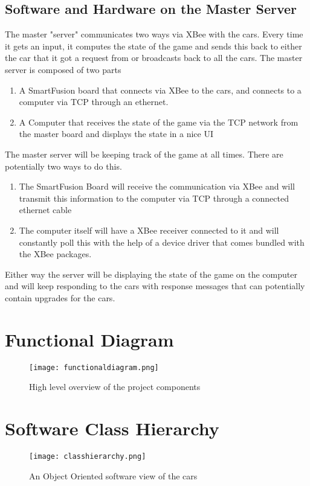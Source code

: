 \documentclass{article}
\begin{document}
\subsection{Software and Hardware on the Master Server}
The master "server" communicates two ways via XBee with the cars.  Every
time it gets an input, it computes the state of the game and sends this back
to either the car that it got a request from or broadcasts back to all the
cars.  The master server is composed of two parts
\begin{enumerate}
    \item A SmartFusion board that connects via XBee to the cars, and connects
    to a computer via TCP through an ethernet.
    \item A Computer that receives the state of the game via the TCP network
    from the master board and displays the state in a nice UI
\end{enumerate}

The master server will be keeping track of the game at all times.  There are
potentially two ways to do this.  
\begin{enumerate}
    \item The SmartFusion Board will receive the communication via XBee and
    will transmit this information to the computer via TCP through a connected
    ethernet cable
    \item The computer itself will have a XBee receiver connected to it and
    will constantly poll this with the help of a device driver that comes
    bundled with the XBee packages. 
\end{enumerate}

Either way the server will be displaying the state of the game on the computer
and will keep responding to the cars with response messages that can
potentially contain upgrades for the cars. 

\newpage
\section{Functional Diagram}
\begin{figure}[!htb]
\centering
\texttt{[image: functionaldiagram.png]}
\caption{High level overview of the project components}
\end{figure}

\newpage
\section{Software Class Hierarchy}
\begin{figure}[!htb]
\centering
\texttt{[image: classhierarchy.png]}
\caption{An Object Oriented software view of the cars}
\end{figure}
\end{document}
